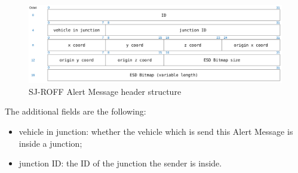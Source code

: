 		\begin{figure}[H]
			\centering
			\includegraphics[width=\textwidth]{immagini/sj-roffAlertHeader}
			\caption{SJ-ROFF Alert Message header structure}
			\label{fig:sj-roffAlertHeader}
		\end{figure}
		
		The additional fields are the following:
		\begin{itemize}
			\item  vehicle in junction: whether the vehicle which is send this Alert Message is inside a junction;
			\item junction ID: the ID of the junction the sender is inside.
		\end{itemize}
		
	
		
		
		
	
